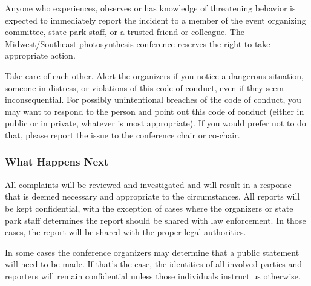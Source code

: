 Anyone who experiences, observes or has knowledge of threatening behavior is expected to immediately report the incident to a member of the event organizing committee, state park staff, or a trusted friend or colleague. The Midwest/Southeast photosynthesis conference reserves the right to take appropriate action.

Take care of each other. Alert the organizers if you notice a dangerous situation, someone in distress, or violations of this code of conduct, even if they seem inconsequential. For possibly unintentional breaches of the code of conduct, you may want to respond to the person and point out this code of conduct (either in public or in private, whatever is most appropriate). If you would prefer not to do that, please report the issue to the conference chair or co-chair.

\subsubsection{What Happens Next}
All complaints will be reviewed and investigated and will result in a response that is deemed necessary and appropriate to the circumstances. All reports will be kept confidential, with the exception of cases where the organizers or state park staff determines the report should be shared with law enforcement. In those cases, the report will be shared with the proper legal authorities.

In some cases the conference organizers may determine that a public statement will need to be made. If that’s the case, the identities of all involved parties and reporters will remain confidential unless those individuals instruct us otherwise.